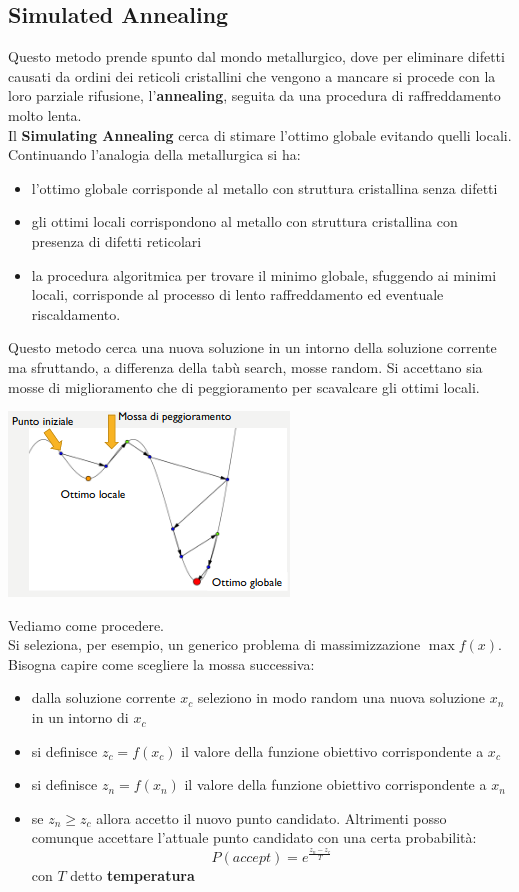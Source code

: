 \message{ !name(ro.tex)}\documentclass[a4paper,12pt, oneside]{book}
\begin{document}
\subsection{Simulated Annealing}
Questo metodo prende spunto dal mondo metallurgico, dove per eliminare
difetti causati da ordini dei reticoli cristallini che vengono a
mancare si procede con la loro parziale rifusione,
l'\textbf{annealing}, seguita da una procedura di raffreddamento molto
lenta.  \\
Il \textbf{Simulating Annealing} cerca di stimare l'ottimo globale
evitando quelli locali. Continuando l'analogia della metallurgica si
ha:
\begin{itemize}
  \item l’ottimo globale corrisponde al metallo con struttura
  cristallina senza difetti  
  \item gli ottimi locali corrispondono al metallo con struttura
  cristallina con presenza di difetti reticolari
  \item la procedura algoritmica per trovare il minimo globale,
  sfuggendo ai minimi locali, corrisponde al processo di lento
  raffreddamento ed eventuale riscaldamento. 
\end{itemize}
Questo metodo cerca una nuova soluzione in un intorno della soluzione
corrente ma sfruttando, a differenza della tabù search, mosse
random. Si accettano sia mosse di miglioramento che di peggioramento
per scavalcare gli ottimi locali.
\begin{center}
  \includegraphics[scale = 0.8]{img/sa.png}
\end{center}
Vediamo come procedere.\\
Si seleziona, per esempio, un generico problema di massimizzazione
$\max f(x)$. Bisogna capire come scegliere la mossa successiva:
\begin{itemize}
  \item dalla soluzione corrente $x_c$ seleziono in modo random una
  nuova soluzione $x_n$ in un intorno di $x_c$
  \item si definisce $z_c=f(x_c)$ il valore della funzione obiettivo
  corrispondente a $x_c$
  \item si definisce $z_n=f(x_n)$ il valore della funzione obiettivo
  corrispondente a $x_n$
  \item se $z_n\geq z_c$ allora accetto il nuovo punto candidato.
  Altrimenti posso comunque accettare l’attuale punto candidato con
  una certa probabilità:
  \[P(accept)=e^{\frac{z_n-z_c}{T}}\]
  con $T$ detto \textbf{temperatura}
\end{itemize}
\end{document}
